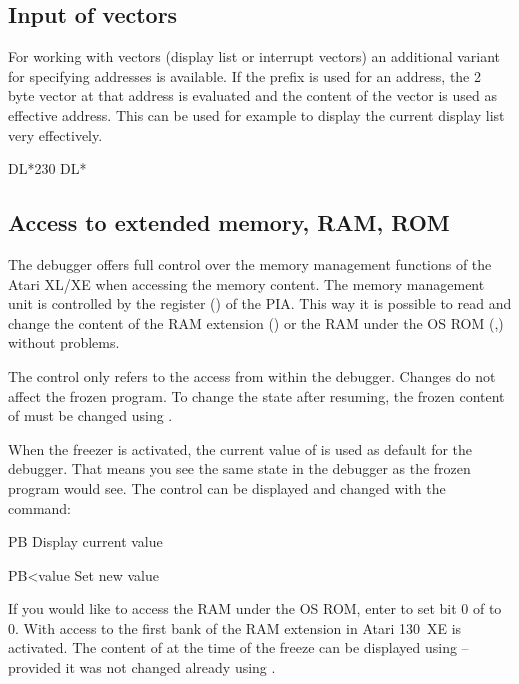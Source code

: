 \subsection{Input of vectors}
For working with vectors (\ie display list or interrupt vectors) an additional
variant for specifying addresses is available. If the prefix \fq{\fcmd{*}} is used
for an address, the 2 byte vector at that address is evaluated and the content
of the vector is used as effective address. This can be used for example to
display the current display list very effectively.
\begin{fcode}
DL*230
DL*%
\end{fcode}

\subsection{Access to extended memory, RAM, ROM}
The debugger offers full control over the memory management functions of the
Atari XL/XE when accessing the memory content. The memory management unit is
controlled by the register  () of the PIA.
This way it is possible to read and change the content of the RAM extension
() or the RAM under the OS ROM
(,) without problems.

The  control only refers to the access from within the debugger.
Changes do not affect the frozen program. To change the state after resuming, the
frozen content of  must be changed using .

When the freezer is activated, the current value of  is used as
default for the debugger. That means you see the same state in the debugger as
the frozen program would see. The  control can be displayed and
changed with the  command:
\begin{fcmdlist}
\item[PB] Display current  value
\item[PB{\textless}value] Set new  value
\end{fcmdlist}

If you would like to access the RAM under the OS ROM, enter
 to set bit 0 of  to 0. With
 access to the first bank of the RAM extension in Atari
130~XE is activated. The content of  at the time of the freeze can
be displayed using  -- provided it was not changed already using
.

